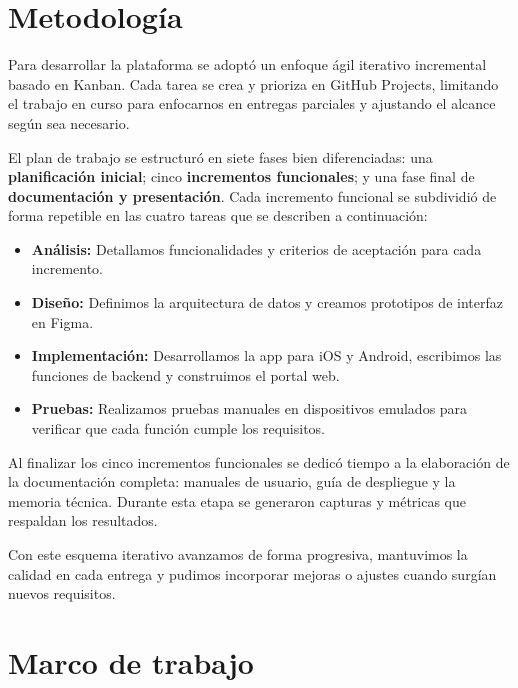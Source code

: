 \section{Metodología}

\begin{large}

Para desarrollar la plataforma se adoptó un enfoque ágil iterativo incremental basado en Kanban. Cada tarea se crea y prioriza en GitHub Projects, limitando el trabajo en curso para enfocarnos en entregas parciales y ajustando el alcance según sea necesario.

El plan de trabajo se estructuró en siete fases bien diferenciadas: una \textbf{planificación inicial}; cinco \textbf{incrementos funcionales}; y una fase final de \textbf{documentación y presentación}. Cada incremento funcional se subdividió de forma repetible en las cuatro tareas que se describen a continuación:

\begin{itemize}
  \item \textbf{Análisis:} Detallamos funcionalidades y criterios de aceptación para cada incremento.
  \item \textbf{Diseño:} Definimos la arquitectura de datos y creamos prototipos de interfaz en Figma.
  \item \textbf{Implementación:} Desarrollamos la app para iOS y Android, escribimos las funciones de backend y construimos el portal web.  
  \item \textbf{Pruebas:} Realizamos pruebas manuales en dispositivos emulados para verificar que cada función cumple los requisitos.
\end{itemize}

Al finalizar los cinco incrementos funcionales se dedicó tiempo a la elaboración de la documentación completa: manuales de usuario, guía de despliegue y la memoria técnica. Durante esta etapa se generaron capturas y métricas que respaldan los resultados.

Con este esquema iterativo avanzamos de forma progresiva, mantuvimos la calidad en cada entrega y pudimos incorporar mejoras o ajustes cuando surgían nuevos requisitos.

\end{large}

\section{Marco de trabajo}

